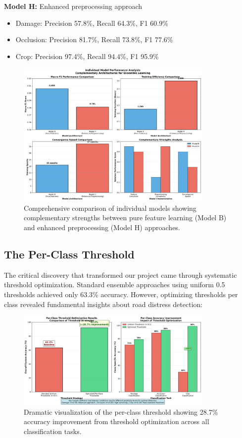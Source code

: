 \documentclass[12pt]{article}
\begin{document}
\noindent\textbf{Model H:} Enhanced preprocessing approach
\begin{itemize}[itemsep=1pt,parsep=0pt,topsep=2pt]
\item Damage: Precision 57.8\%, Recall 64.3\%, F1 60.9\%
\item Occlusion: Precision 81.7\%, Recall 73.8\%, F1 77.6\%
\item Crop: Precision 97.4\%, Recall 94.4\%, F1 95.9\%
\end{itemize}


\begin{figure}[!htb]
\centering
\includegraphics[width=0.85\textwidth]{images/model_comparison_detailed.png}
\caption{Comprehensive comparison of individual models showing complementary strengths between pure feature learning (Model B) and enhanced preprocessing (Model H) approaches.}
\end{figure}

\subsection{The Per-Class Threshold}

The critical discovery that transformed our project came through systematic threshold optimization. Standard ensemble approaches using uniform 0.5 thresholds achieved only 63.3\% accuracy. However, optimizing thresholds per class revealed fundamental insights about road distress detection:

\begin{figure}[!htb]
\centering
\includegraphics[width=0.85\textwidth]{images/breakthrough_analysis.png}
\caption{Dramatic visualization of the per-class threshold showing 28.7\% accuracy improvement from threshold optimization across all classification tasks.}
\end{figure}
\end{document}

